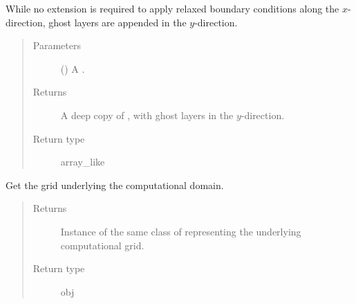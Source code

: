 \documentclass[letterpaper,10pt,english]{sphinxmanual}
\begin{document}
\begin{fulllineitems}

\begin{fulllineitems}
\label{\detokenize{api:tasmania.dycore.horizontal_boundary_relaxed.RelaxedXZ.from_physical_to_computational_domain}}
While no extension is required to apply relaxed boundary conditions along the \(x\)-direction,
 ghost layers are appended in the \(y\)-direction.
\begin{quote}\begin{description}
\item[{Parameters}] \leavevmode
{} () \textendash{} A .

\item[{Returns}] \leavevmode
A deep copy of , with  ghost layers in the \(y\)-direction.

\item[{Return type}] \leavevmode
array\_like

\end{description}\end{quote}

\end{fulllineitems}


\begin{fulllineitems}
\label{\detokenize{api:tasmania.dycore.horizontal_boundary_relaxed.RelaxedXZ.get_computational_grid}}
Get the  grid underlying the computational domain.
\begin{quote}\begin{description}
\item[{Returns}] \leavevmode
Instance of the same class of 
representing the underlying computational grid.

\item[{Return type}] \leavevmode
obj


\end{description}
\end{quote}
\end{fulllineitems}
\end{fulllineitems}
\end{document}
